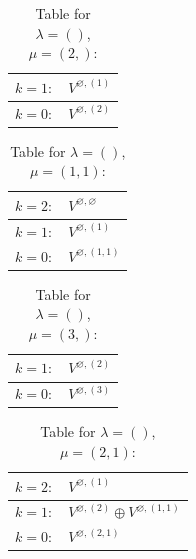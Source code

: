 \renewcommand{\arraystretch}{1.6} 
\begin{table}[H]
\centering
\caption{Table for $\lambda = ()$, $\mu = (2,)$:}
\begin{tabular}{|>{\centering\arraybackslash}p{15cm}|}
\hline
 $k = 1: \quad V^{\varnothing, (1)} $ \\ \hline
 $k = 0: \quad V^{\varnothing, (2)} $ \\ \hline
\end{tabular}
\end{table}

\renewcommand{\arraystretch}{1.6} 
\begin{table}[H]
\centering
\caption{Table for $\lambda = ()$, $\mu = (1, 1)$:}
\begin{tabular}{|>{\centering\arraybackslash}p{15cm}|}
\hline
 $k = 2: \quad V^{\varnothing, \varnothing} $ \\ \hline
 $k = 1: \quad V^{\varnothing, (1)} $ \\ \hline
 $k = 0: \quad V^{\varnothing, (1, 1)} $ \\ \hline
\end{tabular}
\end{table}

\renewcommand{\arraystretch}{1.6} 
\begin{table}[H]
\centering
\caption{Table for $\lambda = ()$, $\mu = (3,)$:}
\begin{tabular}{|>{\centering\arraybackslash}p{15cm}|}
\hline
 $k = 1: \quad V^{\varnothing, (2)} $ \\ \hline
 $k = 0: \quad V^{\varnothing, (3)} $ \\ \hline
\end{tabular}
\end{table}

\renewcommand{\arraystretch}{1.6} 
\begin{table}[H]
\centering
\caption{Table for $\lambda = ()$, $\mu = (2, 1)$:}
\begin{tabular}{|>{\centering\arraybackslash}p{15cm}|}
\hline
 $k = 2: \quad V^{\varnothing, (1)} $ \\ \hline
 $k = 1: \quad V^{\varnothing, (2)} \oplus V^{\varnothing, (1, 1)} $ \\ \hline
 $k = 0: \quad V^{\varnothing, (2, 1)} $ \\ \hline
\end{tabular}
\end{table}

